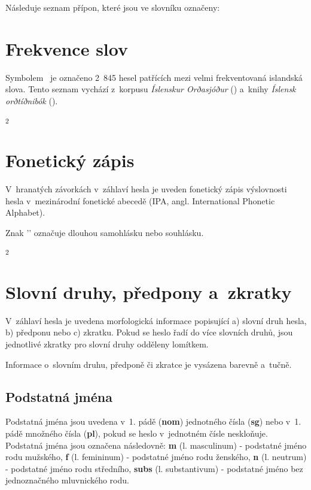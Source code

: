 Následuje seznam přípon, které jsou ve slovníku označeny:

\tableA

\section{Frekvence slov}

Symbolem \dicsymFrequent\ je označeno 2~845 hesel patřících mezi velmi frekventovaná islandská slova. Tento seznam vychází z~korpusu \textit{Íslenskur Orðasjóður} (\cite{int7}) a~knihy \textit{Íslensk orðtíðnibók} (\cite{is2}).

\blspace
  \dicEntry {}\textsuperscript{2} \dicsymFrequent
\blspace

\section{Fonetický zápis}

V~hranatých závorkách v~záhlaví hesla je uveden fonetický zápis výslovnosti hesla v~mezinárodní fonetické abecedě (IPA, angl. International Phonetic Alphabet).

\blspace
  \dicEntry {} 
\blspace

Znak '{\textlengthmark}' označuje dlouhou samohlásku nebo souhlásku.

\blspace
  \dicEntry {}\textsuperscript{2} 
\blspace

\section{Slovní druhy, předpony a~zkratky}

V~záhlaví hesla je uvedena morfologická informace popisující a) slovní druh hesla, b) předponu nebo c) zkratku. Pokud se heslo řadí do více slovních druhů, jsou jednotlivé zkratky pro slovní druhy odděleny lomítkem.

\blspace
  \dicEntry {} 
\blspace

Informace o~slovním druhu, předponě či zkratce je vysázena barevně a~tučně.

\subsection*{Podstatná jména}

Podstatná jména jsou uvedena v~1. pádě (\textbf{nom}) jednotného čísla (\textbf{sg}) nebo v~1. pádě množného čísla (\textbf{pl}), pokud se heslo v~jednotném čísle neskloňuje. Podstatná jména jsou označena následovně: \textbf{m} (l. masculinum) - podstatné jméno rodu mužského,
\textbf{f} (l. femininum) - podstatné jméno rodu ženského, \textbf{n} (l. neutrum) - podstatné jméno rodu středního, \textbf{subs} (l. substantivum) - podstatné jméno bez jednoznačného mluvnického rodu.

